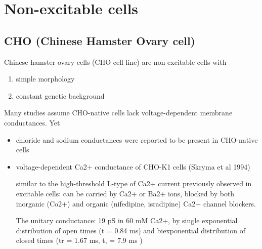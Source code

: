 \chapter{Non-excitable cells}

\section{CHO (Chinese Hamster Ovary cell)}
\label{sec:CHO}
\label{sec:Chinese-Hamster-Ovary-cell}

Chinese hamster ovary cells (CHO cell line) are non-excitable cells with 
\begin{enumerate}
  \item simple morphology
  \item constant genetic background
\end{enumerate}
Many studies assume CHO-native cells lack voltage-dependent
membrane conductances. Yet
\begin{itemize}
  \item  chloride and sodium conductances were reported to be present
  in CHO-native cells
  
  \item voltage-dependent Ca2+ conductance of CHO-K1 cells (Skryma et al 1994)
  
 similar to the high-threshold L-type of Ca2+ current previously observed in
 excitable cells:  can be carried by Ca2+ or Ba2+ ions, blocked by both
 inorganic (Co2+) and organic (nifedipine, isradipine) Ca2+ channel blockers.
 
 The unitary conductance: 19 pS in 60 mM Ca2+, by single exponential
 distribution of open times (t = 0.84 ms) and biexponential distribution of
 closed times (tr = 1.67 ms, t, = 7.9 ms )

  
\end{itemize}